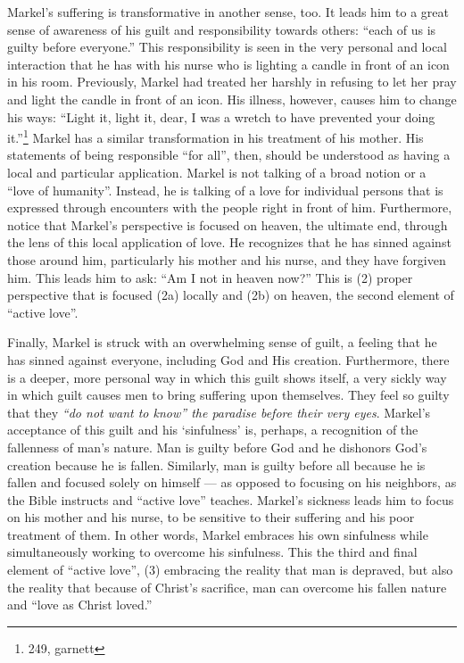   Markel's suffering is transformative in another sense, too. It leads him to a great sense of awareness of his guilt and responsibility towards others: ``each of us is guilty before everyone.'' This responsibility is seen in the very personal and local interaction that he has with his nurse who is lighting a candle in front of an icon in his room. Previously, Markel had treated her harshly in refusing to let her pray and light the candle in front of an icon. His illness, however, causes him to change his ways: ``Light it, light it, dear, I was a wretch to have prevented your doing it.''\footnote{249, garnett} Markel has a similar transformation in his treatment of his mother. His statements of being responsible ``for all'', then, should be understood as having a local and particular application. Markel is not talking of a broad notion or a ``love of humanity''. Instead, he is talking of a love for individual persons that is expressed through encounters with the people right in front of him. Furthermore, notice that Markel's perspective is focused on heaven, the ultimate end, through the lens of this local application of love. He recognizes that he has sinned against those around him, particularly his mother and his nurse, and they have forgiven him. This leads him to ask: ``Am I not in heaven now?'' This is (2) proper perspective that is focused (2a) locally and (2b) on heaven, the second element of ``active love''.
  
  Finally, Markel is struck with an overwhelming sense of guilt, a feeling that he has sinned against everyone, including God and His creation. Furthermore, there is a deeper, more personal way in which this guilt shows itself, a very sickly way in which guilt causes men to bring suffering upon themselves. They feel so guilty that they \emph{``do not want to know'' the paradise before their very eyes}. Markel's acceptance of this guilt and his `sinfulness' is, perhaps, a recognition of the fallenness of man's nature. Man is guilty before God and he dishonors God's creation because he is fallen. Similarly, man is guilty before all because he is fallen and focused solely on himself --- as opposed to focusing on his neighbors, as the Bible instructs and ``active love'' teaches. Markel's sickness leads him to focus on his mother and his nurse, to be sensitive to their suffering and his poor treatment of them. In other words, Markel embraces his own sinfulness while simultaneously working to overcome his sinfulness. This the third and final element of ``active love'', (3) embracing the reality that man is depraved, but also the reality that because of Christ's sacrifice, man can overcome his fallen nature and ``love as Christ loved.''
  
